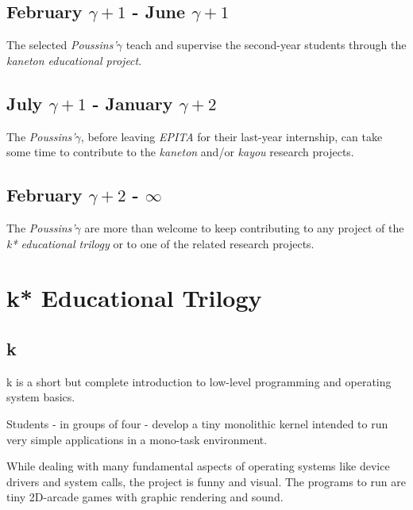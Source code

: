 \begin{multicols}{2}
%
%

\subsection{February $\gamma + 1$ - June $\gamma + 1$}

The selected \textit{Poussins'$\gamma$} teach and supervise the second-year
students through the \textit{kaneton educational project}.

%
%

\subsection{July $\gamma + 1$ - January $\gamma + 2$}

The \textit{Poussins'$\gamma$}, before leaving \textit{EPITA} for their
last-year internship, can take some time to contribute to the \textit{kaneton}
and/or \textit{kayou} research projects.

%
%

\subsection{February $\gamma + 2$ - $\infty$}

The \textit{Poussins'$\gamma$} are more than welcome to keep contributing
to any project of the \textit{k* educational trilogy} or to one of the related
research projects.

%
%

\section{k* Educational Trilogy}

%
%

\subsection{k}

k is a short but complete introduction to low-level programming and
operating system basics.

Students - in groups of four - develop a tiny monolithic kernel
intended to run very simple applications in a mono-task environment.

While dealing with many fundamental aspects of operating systems like
device drivers and system calls, the project is funny and visual. The
programs to run are tiny 2D-arcade games with graphic rendering and
sound.


\end{multicols}
